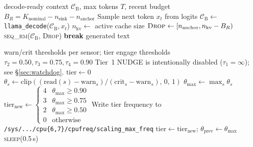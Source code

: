 \documentclass[sigconf, anonymous=false, screen=true]{acmart}
\begin{document}
\begin{algorithm}[t]
\caption{\texttt{v1\_fa2\_stack} decode loop}
\label{alg:decode}
\begin{algorithmic}[1]
\Require decode-ready context $\mathcal{C}_{\text{B}}$, max tokens $T$, recent budget $B_R = K_{\text{nominal}} - n_{\text{sink}} - n_{\text{anchor}}$
  \State Sample next token $x_t$ from logits
  \State $\mathcal{C}_{\text{B}} \gets$ \texttt{llama\_decode}($\mathcal{C}_{\text{B}}, x_t$) 
  \State $n_{\text{kv}} \gets$ active cache size
   
    \State $\textsc{Drop} \gets [n_{\text{anchor}}, n_{\text{kv}} - B_R)$ 
    \State \textsc{seq\_rm}($\mathcal{C}_{\text{B}}$, \textsc{Drop})
  \EndIf
    \State \textbf{break}
  \EndIf
\EndFor
\State \Return generated text
\end{algorithmic}
\end{algorithm}

\begin{algorithm}[t]
\caption{Multi-sensor cliff-insurance watchdog (Controller~5, parallel process)}
\label{alg:watchdog}
\begin{algorithmic}[1]
\Require warn/crit thresholds per sensor; tier engage thresholds $\tau_2 = 0.50, \tau_3 = 0.75, \tau_4 = 0.90$
\Statex Tier~1 NUDGE is intentionally disabled ($\tau_1 = \infty$); see \S\ref{sec:watchdog}.
\State $\text{tier} \gets 0$ 
    \State $\theta_s \gets \mathrm{clip}((\text{read}(s) - \text{warn}_s) / (\text{crit}_s - \text{warn}_s),\, 0,\, 1)$
  \EndFor
  \State $\theta_{\max} \gets \max_s \theta_s$ 
  \State $\text{tier}_{\text{new}} \gets \begin{cases} 4 & \theta_{\max} \ge 0.90 \\ 3 & \theta_{\max} \ge 0.75 \\ 2 & \theta_{\max} \ge 0.50 \\ 0 & \text{otherwise} \end{cases}$
   
    \State Write tier frequency to \texttt{/sys/.../cpu\{6,7\}/cpufreq/scaling\_max\_freq}
    \State $\text{tier} \gets \text{tier}_{\text{new}}$; $\theta_{\text{prev}} \gets \theta_{\max}$
  \EndIf
  \State \textsc{sleep}(0.5\,s)
\EndWhile
\end{algorithmic}
\end{algorithm}
\end{document}
